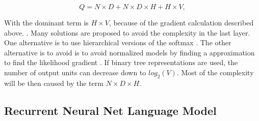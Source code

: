 \begin{center}
\begin{equation} Q = N \times D + N \times D \times H + H \times V,   \end{equation}
\end{center}

With the dominant term is $H \times V$, because of the gradient calculation
described above.
\cite{DBLP:journals/corr/abs-1301-3781}. Many solutions are proposed to avoid
the complexity in the last layer. One alternative is to use  hierarchical
versions of the softmax \cite{Morin05hierarchicalprobabilistic,6163930}.
The other alternative is to avoid is to avoid  normalized models by finding
a approximation to find the likelihood gradient \cite{NIPS2013_5165} . If binary tree representations are
used, the number of output units can decrease down to $log_2(V)$. Most
of the complexity will be then caused by the term  $N \times D \times H$.






\subsection{Recurrent Neural Net Language Model}

